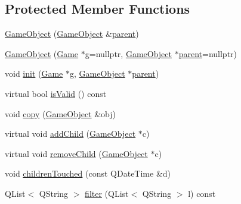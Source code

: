 \subsection*{\-Protected \-Member \-Functions}
\begin{DoxyCompactItemize}
\item 
\hyperlink{class_game_object_a7f99ba7231f83306f28a23923329f153}{\-Game\-Object} (\hyperlink{class_game_object}{\-Game\-Object} \&\hyperlink{class_game_object_af3deaf39cde23c189765634e32e95bb4}{parent})
\item 
\hyperlink{class_game_object_ab00c537faf6eb4439c60003141a763b9}{\-Game\-Object} (\hyperlink{class_game}{\-Game} $\ast$g=nullptr, \hyperlink{class_game_object}{\-Game\-Object} $\ast$\hyperlink{class_game_object_af3deaf39cde23c189765634e32e95bb4}{parent}=nullptr)
\item 
void \hyperlink{class_game_object_abb6a1fa1a89307820874179b20010f6d}{init} (\hyperlink{class_game}{\-Game} $\ast$g, \hyperlink{class_game_object}{\-Game\-Object} $\ast$\hyperlink{class_game_object_af3deaf39cde23c189765634e32e95bb4}{parent})
\item 
virtual bool \hyperlink{class_game_object_a88676a10f8e905747f1d64c2da490524}{is\-Valid} () const 
\item 
void \hyperlink{class_game_object_acd88a097e5244d11225874958b0af3dd}{copy} (\hyperlink{class_game_object}{\-Game\-Object} \&obj)
\item 
virtual void \hyperlink{class_game_object_a4733a1081db3c2d0a9be225265283ad8}{add\-Child} (\hyperlink{class_game_object}{\-Game\-Object} $\ast$c)
\item 
virtual void \hyperlink{class_game_object_a21dc679cb474b147b7d7d336117ffe58}{remove\-Child} (\hyperlink{class_game_object}{\-Game\-Object} $\ast$c)
\item 
void \hyperlink{class_game_object_a4e57d5a3f8be6882e5d7f2a2e5d45ccd}{children\-Touched} (const \-Q\-Date\-Time \&d)
\item 
\-Q\-List$<$ \-Q\-String $>$ \hyperlink{class_game_object_a05c00e0f34a146c91275fb67ce62dfcf}{filter} (\-Q\-List$<$ \-Q\-String $>$ l) const 
\end{DoxyCompactItemize}

